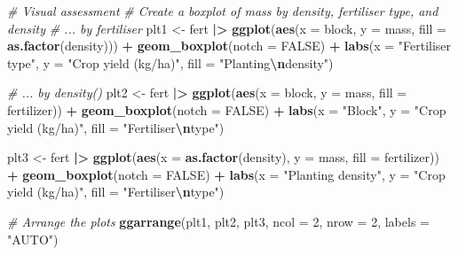 \documentclass[
  10t,
]{article}
\newenvironment{Shaded}{\begin{snugshade}}{\end{snugshade}}
\newcommand{\AttributeTok}[1]{\textcolor[rgb]{0.13,0.29,0.53}{#1}}
\newcommand{\CommentTok}[1]{\textcolor[rgb]{0.56,0.35,0.01}{\textit{#1}}}
\newcommand{\ConstantTok}[1]{\textcolor[rgb]{0.56,0.35,0.01}{#1}}
\newcommand{\DecValTok}[1]{\textcolor[rgb]{0.00,0.00,0.81}{#1}}
\newcommand{\FunctionTok}[1]{\textcolor[rgb]{0.13,0.29,0.53}{\textbf{#1}}}
\newcommand{\NormalTok}[1]{#1}
\newcommand{\OtherTok}[1]{\textcolor[rgb]{0.56,0.35,0.01}{#1}}
\newcommand{\SpecialCharTok}[1]{\textcolor[rgb]{0.81,0.36,0.00}{\textbf{#1}}}
\newcommand{\StringTok}[1]{\textcolor[rgb]{0.31,0.60,0.02}{#1}}
\begin{document}
\begin{Shaded}
\begin{Highlighting}[]
\CommentTok{\# Visual assessment}
\CommentTok{\# Create a boxplot of mass by density, fertiliser type, and density}
\CommentTok{\# ... by fertiliser}
\NormalTok{plt1 }\OtherTok{\textless{}{-}}\NormalTok{ fert }\SpecialCharTok{|\textgreater{}} 
  \FunctionTok{ggplot}\NormalTok{(}\FunctionTok{aes}\NormalTok{(}\AttributeTok{x =}\NormalTok{ block, }\AttributeTok{y =}\NormalTok{ mass, }\AttributeTok{fill =} \FunctionTok{as.factor}\NormalTok{(density))) }\SpecialCharTok{+}
  \FunctionTok{geom\_boxplot}\NormalTok{(}\AttributeTok{notch =} \ConstantTok{FALSE}\NormalTok{) }\SpecialCharTok{+}
  \FunctionTok{labs}\NormalTok{(}\AttributeTok{x =} \StringTok{"Fertiliser type"}\NormalTok{,}
       \AttributeTok{y =} \StringTok{"Crop yield (kg/ha)"}\NormalTok{,}
       \AttributeTok{fill =} \StringTok{"Planting}\SpecialCharTok{\textbackslash{}n}\StringTok{density"}\NormalTok{)}

\CommentTok{\# ... by density()}
\NormalTok{plt2 }\OtherTok{\textless{}{-}}\NormalTok{ fert }\SpecialCharTok{|\textgreater{}} 
  \FunctionTok{ggplot}\NormalTok{(}\FunctionTok{aes}\NormalTok{(}\AttributeTok{x =}\NormalTok{ block, }\AttributeTok{y =}\NormalTok{ mass, }\AttributeTok{fill =}\NormalTok{ fertilizer)) }\SpecialCharTok{+}
  \FunctionTok{geom\_boxplot}\NormalTok{(}\AttributeTok{notch =} \ConstantTok{FALSE}\NormalTok{) }\SpecialCharTok{+}
  \FunctionTok{labs}\NormalTok{(}\AttributeTok{x =} \StringTok{"Block"}\NormalTok{,}
       \AttributeTok{y =} \StringTok{"Crop yield (kg/ha)"}\NormalTok{,}
       \AttributeTok{fill =} \StringTok{"Fertiliser}\SpecialCharTok{\textbackslash{}n}\StringTok{type"}\NormalTok{)}

\NormalTok{plt3 }\OtherTok{\textless{}{-}}\NormalTok{ fert }\SpecialCharTok{|\textgreater{}} 
  \FunctionTok{ggplot}\NormalTok{(}\FunctionTok{aes}\NormalTok{(}\AttributeTok{x =} \FunctionTok{as.factor}\NormalTok{(density), }\AttributeTok{y =}\NormalTok{ mass, }\AttributeTok{fill =}\NormalTok{ fertilizer)) }\SpecialCharTok{+}
  \FunctionTok{geom\_boxplot}\NormalTok{(}\AttributeTok{notch =} \ConstantTok{FALSE}\NormalTok{) }\SpecialCharTok{+}
  \FunctionTok{labs}\NormalTok{(}\AttributeTok{x =} \StringTok{"Planting density"}\NormalTok{,}
       \AttributeTok{y =} \StringTok{"Crop yield (kg/ha)"}\NormalTok{,}
       \AttributeTok{fill =} \StringTok{"Fertiliser}\SpecialCharTok{\textbackslash{}n}\StringTok{type"}\NormalTok{)}

\CommentTok{\# Arrange the plots}
\FunctionTok{ggarrange}\NormalTok{(plt1, plt2, plt3, }\AttributeTok{ncol =} \DecValTok{2}\NormalTok{, }\AttributeTok{nrow =} \DecValTok{2}\NormalTok{, }\AttributeTok{labels =} \StringTok{"AUTO"}\NormalTok{)}
\end{Highlighting}
\end{Shaded}
\end{document}
